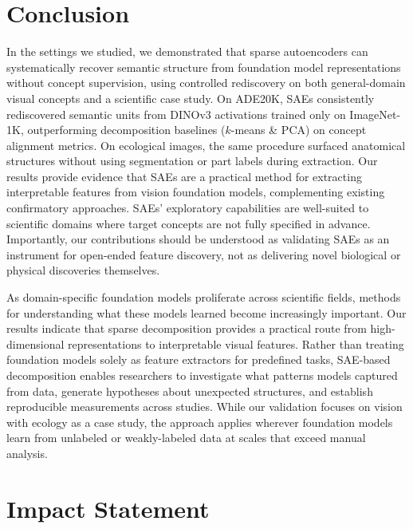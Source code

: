 \documentclass{article}
\theoremstyle{plain}
\theoremstyle{definition}
\theoremstyle{remark}
\begin{document}
\section{Conclusion}

In the settings we studied, we demonstrated that sparse autoencoders can systematically recover semantic structure from foundation model representations without concept supervision, using controlled rediscovery on both general-domain visual concepts and a scientific case study.
On ADE20K, SAEs consistently rediscovered semantic units from DINOv3 activations trained only on ImageNet-1K, outperforming decomposition baselines ($k$-means \& PCA) on concept alignment metrics. 
On ecological images, the same procedure surfaced anatomical structures without using segmentation or part labels during extraction.
Our results provide evidence that SAEs are a practical method for extracting interpretable features from vision foundation models, complementing existing confirmatory approaches.
SAEs' exploratory capabilities are well-suited to scientific domains where target concepts are not fully specified in advance.
Importantly, our contributions should be understood as validating SAEs as an instrument for open-ended feature discovery, not as delivering novel biological or physical discoveries themselves.

As domain-specific foundation models proliferate across scientific fields, methods for understanding what these models learned become increasingly important. 
Our results indicate that sparse decomposition provides a practical route from high-dimensional representations to interpretable visual features. 
Rather than treating foundation models solely as feature extractors for predefined tasks, SAE-based decomposition enables researchers to investigate what patterns models captured from data, generate hypotheses about unexpected structures, and establish reproducible measurements across studies. 
While our validation focuses on vision with ecology as a case study, the approach applies wherever foundation models learn from unlabeled or weakly-labeled data at scales that exceed manual analysis.



\section*{Impact Statement}
\end{document}
